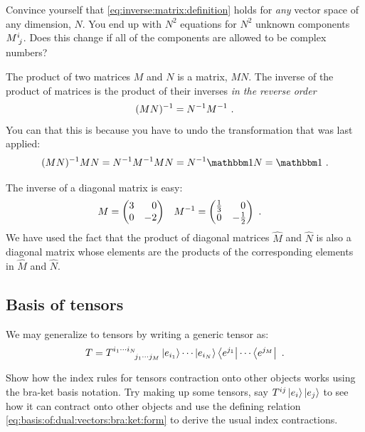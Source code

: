 \begin{exercise}
Convince yourself that \eqref{eq:inverse:matrix:definition} holds for \emph{any} vector space of any dimension, $N$. You end up with $N^2$ equations for $N^2$ unknown components $M\aij{i}{j}$. Does this change if all of the components are allowed to be complex numbers?
\end{exercise}


The product of two matrices $M$ and $N$ is a matrix, $MN$. The inverse of the product of matrices is the product of their inverses \emph{in the reverse order}
\begin{align}
    (MN)^{-1} = N^{-1} M^{-1} \ .
\end{align}
You can that this is because you have to undo the transformation that was last applied:
\begin{align}
    (MN)\inv MN = N\inv M\inv MN = N\inv \one  N = \one  \ .
\end{align}




\begin{example}
The inverse of a diagonal matrix is easy:
\begin{align}
    M &=
    \begin{pmatrix}
     3 & \pp  0 \\
     0 & -2
    \end{pmatrix}
    &
    M\inv &=
    \begin{pmatrix}
    \frac{1}{3} & \pp 0 \\
    0 & -\frac{1}{2}
    \end{pmatrix} \ .
\end{align}
We have used the fact that the product of diagonal matrices $\hat M$ and $\hat N$ is also a diagonal matrix whose elements are the products of the corresponding elements in $\hat M$ and $\hat N$.
\end{example}



\subsection{Basis of tensors}

 We may generalize to tensors by writing a generic tensor as:
 \begin{align}
    T =
     T\aij{i_1\cdots i_N}{j_1\cdots j_M}
     \ket{e_{i_1}}\cdots \ket{e_{i_N}}
     \bra{e^{j_1}}\cdots \bra{e^{j_M}} \ .
     \label{eq:tensor:T:with:basis}
 \end{align}
\begin{exercise}
Show how the index rules for tensors contraction onto other objects works using the bra-ket basis notation. Try making up some tensors, say $T^{ij} \left|e_i\right\rangle\left|e_j\right\rangle$ to see how it can contract onto other objects and use the defining relation \eqref{eq:basis:of:dual:vectors:bra:ket:form} to derive the usual index contractions. 
\end{exercise}

